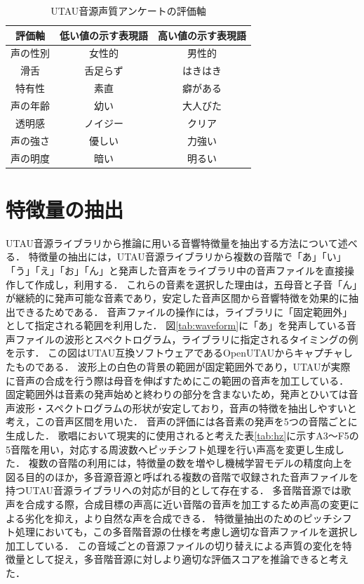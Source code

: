 \begin{table}[htb]
  \centering
  \caption{UTAU音源声質アンケートの評価軸}
  \label{tab:survey}
  \begin{tabular}{c|cc}
    \hline
    評価軸 & 低い値の示す表現語 & 高い値の示す表現語 \\
    \hline
    声の性別 & 女性的 & 男性的 \\
    滑舌 & 舌足らず & はきはき \\
    特有性 & 素直 & 癖がある \\
    声の年齢 & 幼い & 大人びた \\
    透明感 & ノイジー & クリア \\
    声の強さ & 優しい & 力強い \\
    声の明度 & 暗い & 明るい \\
    \hline
  \end{tabular}
\end{table}

\section{特徴量の抽出}
\label{sec:feature}

UTAU音源ライブラリから推論に用いる音響特徴量を抽出する方法について述べる．
特徴量の抽出には，UTAU音源ライブラリから複数の音階で「あ」「い」「う」「え」「お」「ん」と発声した音声をライブラリ中の音声ファイルを直接操作して作成し，利用する．
これらの音素を選択した理由は，五母音と子音「ん」が継続的に発声可能な音素であり，安定した音声区間から音響特徴を効果的に抽出できるためである．
音声ファイルの操作には，ライブラリに「固定範囲外」として指定される範囲を利用した．
図\ref{tab:waveform}に「あ」を発声している音声ファイルの波形とスペクトログラム，ライブラリに指定されるタイミングの例を示す．
この図はUTAU互換ソフトウェアであるOpenUTAUからキャプチャしたものである．
波形上の白色の背景の範囲が固定範囲外であり，UTAUが実際に音声の合成を行う際は母音を伸ばすためにこの範囲の音声を加工している．
固定範囲外は音素の発声始めと終わりの部分を含まないため，発声とひいては音声波形・スペクトログラムの形状が安定しており，音声の特徴を抽出しやすいと考え，この音声区間を用いた．
音声の評価には各音素の発声を5つの音階ごとに生成した．
歌唱において現実的に使用されると考えた表\ref{tab:hz}に示すA3〜F5の5音階を用い，対応する周波数へピッチシフト処理を行い声高を変更し生成した．
複数の音階の利用には，特徴量の数を増やし機械学習モデルの精度向上を図る目的のほか，多音源音源と呼ばれる複数の音階で収録された音声ファイルを持つUTAU音源ライブラリへの対応が目的として存在する．
多音階音源では歌声を合成する際，合成目標の声高に近い音階の音声を加工するため声高の変更による劣化を抑え，より自然な声を合成できる．
特徴量抽出のためのピッチシフト処理においても，この多音階音源の仕様を考慮し適切な音声ファイルを選択し加工している．
この音域ごとの音源ファイルの切り替えによる声質の変化を特徴量として捉え，多音階音源に対しより適切な評価スコアを推論できると考えた．

